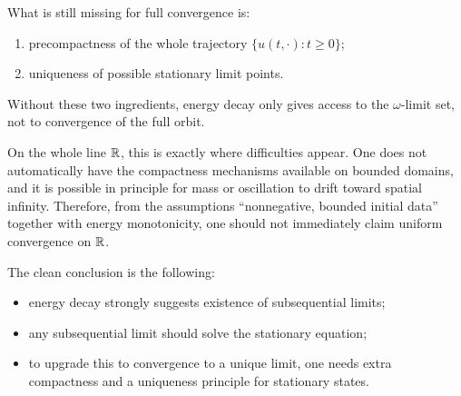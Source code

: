 \begin{remark}
What is still missing for full convergence is:
\begin{enumerate}[leftmargin=2em]
    \item precompactness of the whole trajectory $\{u(t,\cdot): t\ge 0\}$;
    \item uniqueness of possible stationary limit points.
\end{enumerate}
Without these two ingredients, energy decay only gives access to the $\omega$-limit set, not to convergence of the full orbit.
\end{remark}

On the whole line $\mathbb R$, this is exactly where difficulties appear. One does not automatically have the compactness mechanisms available on bounded domains, and it is possible in principle for mass or oscillation to drift toward spatial infinity. Therefore, from the assumptions ``nonnegative, bounded initial data'' together with energy monotonicity, one should not immediately claim uniform convergence on $\mathbb R$.

The clean conclusion is the following:
\begin{itemize}[leftmargin=2em]
    \item energy decay strongly suggests existence of subsequential limits;
    \item any subsequential limit should solve the stationary equation;
    \item to upgrade this to convergence to a unique limit, one needs extra compactness and a uniqueness principle for stationary states.
\end{itemize}
